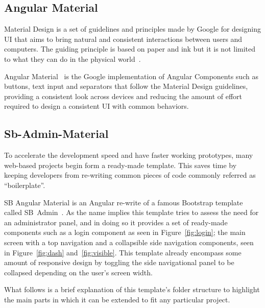\subsection{Angular Material}
Material Design is a set of guidelines and principles made by Google for designing \gls{UI} that aims to bring natural and consistent interactions between users and computers. The guiding principle is based on paper and ink but it is not limited to what they can do in the physical world~\cite{materialdesign}.

Angular Material~\cite{angularmaterial} is the Google implementation of Angular Components such as buttons, text input and separators that follow the Material Design guidelines, providing a consistent look across devices and reducing the amount of effort required to design a consistent \gls{UI} with common behaviors.

\subsection{Sb-Admin-Material}\label{template}
To accelerate the development speed and have faster working prototypes, many web-based projects begin form a ready-made template. This saves time by keeping developers from re-writing common pieces of code commonly referred as ``boilerplate''.

SB Angular Material is an Angular re-write of a famous Bootstrap template called SB~Admin~\cite{angulartemplate}.
As the name implies this template tries to assess the need for an administrator panel, and in doing so it provides a set of ready-made components such as a login component as seen in Figure~\ref{fig:login}; the main screen with a top navigation and a collapsible side navigation components, seen in Figure~\ref{fig:dash} and~\ref{fig:visible}. This template already encompass some amount of responsive design by toggling the side navigational panel to be collapsed depending on the user's screen width.

What follows is a brief explanation of this template's folder structure to highlight the main parts in which it can be extended to fit any particular project.

